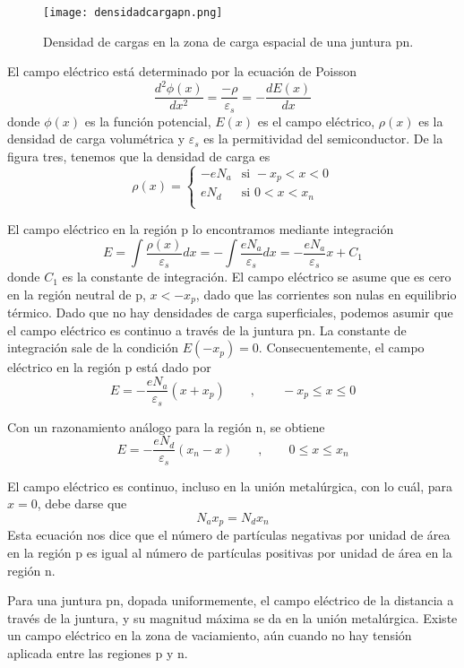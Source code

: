 \documentclass[12pt,a4paper]{article}
\begin{document}
\begin{figure}[ht!]
\begin{center}
\texttt{[image: densidadcargapn.png]}
\caption{Densidad de cargas en la zona de carga espacial de una juntura pn.}
\end{center}
\end{figure}

El campo eléctrico está determinado por la ecuación de Poisson
\[ \frac{d^{2} \phi (x)}{dx^{2}} = \frac{- \rho}{\varepsilon _{s}} = -\frac{dE(x)}{dx} \]
donde $\phi (x)$ es la función potencial, $E(x)$ es el campo eléctrico, $\rho (x)$ es la densidad de carga volumétrica y $\varepsilon _{s}$ es la permitividad del semiconductor. De la figura tres, tenemos que la densidad de carga es
\[ \rho (x)=\left\{ \begin{array}{ll}
-eN_{a} & \textrm{si } -x_{p}<x<0 \\
eN_{d} & \textrm{si } 0<x<x_{n} \\
\end{array} \right. \]

El campo eléctrico en la región p lo encontramos mediante integración
\[ E= \int \frac{\rho (x)}{\varepsilon _{s}} dx=-\int \frac{eN_{a}}{\varepsilon _{s}} dx=-\frac{eN_{a}}{\varepsilon _{s}}x+C_{1} \]
donde $C_{1}$ es la constante de integración. El campo eléctrico se asume que es cero en la región neutral de p, $x<-x_{p}$, dado que las corrientes son nulas en equilibrio térmico. Dado que no hay densidades de carga superficiales, podemos asumir que el campo eléctrico es continuo a través de la juntura pn. La constante de integración sale de la condición $E(-x_{p})=0$. Consecuentemente, el campo eléctrico en la región p está dado por
\[ E=-\frac{eN_{a}}{\varepsilon _{s}} (x+x_{p}) \qquad , \qquad -x_{p} \leq x \leq 0 \]

Con un razonamiento análogo para la región n, se obtiene
\[ E=-\frac{eN_{d}}{\varepsilon _{s}} (x_{n}-x) \qquad , \qquad 0 \leq x \leq x_{n} \]

El campo eléctrico es continuo, incluso en la unión metalúrgica, con lo cuál, para $x=0$, debe darse que
\[ N_{a}x_{p}=N_{d}x_{n} \]
Esta ecuación nos dice que el número de partículas negativas por unidad de área en la región p es igual al número de partículas positivas por unidad de área en la región n.

Para una juntura pn, dopada uniformemente, el campo eléctrico de la distancia a través de la juntura, y su magnitud máxima se da en la unión metalúrgica. Existe un campo eléctrico en la zona de vaciamiento, aún cuando no hay tensión aplicada entre las regiones p y n.
\end{document}

